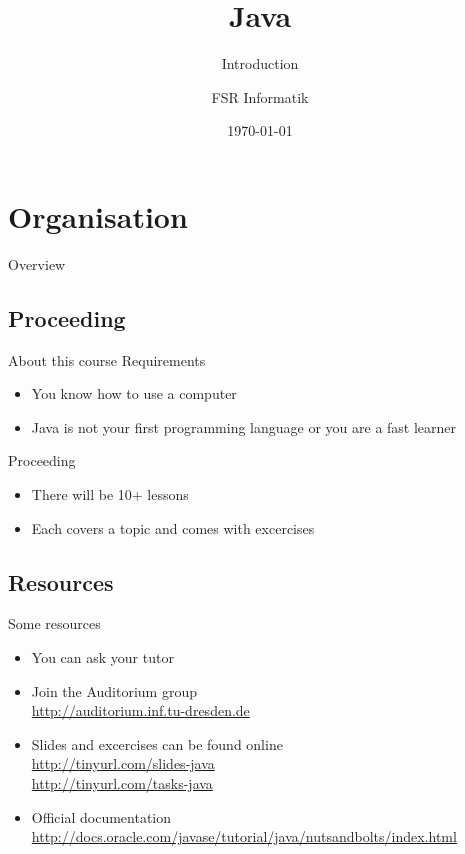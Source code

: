 

\title{Java}
\subtitle{Introduction}
\author{FSR Informatik}
\date{\today}



\section{Organisation}
\begin{frame}
	\titlepage
\end{frame}
\begin{frame}{Overview}
	\tableofcontents
\end{frame}

\subsection{Proceeding}
\begin{frame}{About this course}
	Requirements
	\begin{itemize}
		\item You know how to use a computer
		\item Java is not your first programming language or you are a fast learner
	\end{itemize}
	Proceeding
	\begin{itemize}
		\item There will be 10+ lessons
		\item Each covers a topic and comes with excercises
	\end{itemize}
\end{frame}

\subsection{Resources}
\begin{frame}{Some resources}
	\begin{itemize}
		\item You can ask your tutor
		\item Join the Auditorium group \hfill \\
			\url{http://auditorium.inf.tu-dresden.de}
		\item Slides and excercises can be found online \hfill \\
			\url{http://tinyurl.com/slides-java} \\
			\url{http://tinyurl.com/tasks-java}
		\item Official documentation \hfill \\
			\url{http://docs.oracle.com/javase/tutorial/java/nutsandbolts/index.html}
	\end{itemize}
\end{frame}

